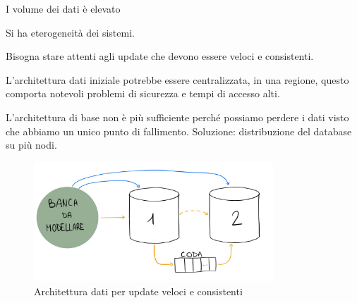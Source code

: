 I volume dei dati è elevato

Si ha eterogeneità dei sistemi.

Bisogna stare attenti agli update che devono essere veloci e consistenti.

L'architettura dati iniziale potrebbe essere centralizzata, in una regione, 
questo comporta notevoli problemi di sicurezza e tempi di accesso alti. 

L'architettura di base non è più sufficiente perché possiamo perdere i dati visto
che abbiamo un unico punto di fallimento. Soluzione: distribuzione del database
su più nodi.

\begin{figure}[!ht]
    \centering
    \includegraphics[width=0.8\textwidth]{./img/modellazione_banca.jpg}
    \caption{Architettura dati per update veloci e consistenti}
    \label{fig:esBanca}
\end{figure}

